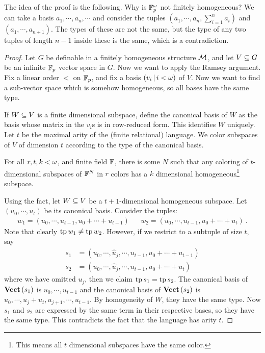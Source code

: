 \documentclass{amsart}
\begin{document}
The idea of the proof is the following.
Why is $\mathbb{F}_p^\omega$ not finitely homogeneous?
We can take a basis $a_1 , \cdots , a_n , \cdots$ and consider the tuples
$\left( a_1 , \cdots , a_n , \sum_{i = 1}^n a_i \right)$
and $\left( a_1 , \cdots , a_{n+1} \right)$. The types of these are not the same, 
but the type of any two tuples of length $n-1$ inside these
is the same, which is a contradiction.

\begin{proof}
Let $G$ be definable in a finitely homogeneous structure $\mathcal{M}$,
and let $V\subseteq G$ be an infinite $\mathbb{F}_p$ vector space in $G$.
Now we want to apply the Ramsey argument.
Fix a linear order $<$ on $\mathbb{F}_p$, and fix a basis
$\left( v_i \, \middle\vert \, i < \omega \right)$ of $V$.
Now we want to find a sub-vector space which is somehow homogeneous, so all bases have 
the same type.

If $W\subseteq V$ is a finite dimensional subspace, 
define the canonical basis of $W$ as the basis whose matrix in the $v_i$s is in
row-reduced form. This identifies $W$ uniquely.
Let $t$ be the maximal arity of the (finite relational) language.
We color subspaces of $V$ of dimension $t$ according to the type of the canonical basis. 

\begin{fact}
For all $r,t,k < \omega$, and finite field $\mathbb{F}$, there is some $N$ such that any coloring of
$t$-dimensional subspaces of $\mathbb{F}^N$ in $r$ colors has a $k$ dimensional
homogeneous\footnote{This means all $t$ dimensional subspaces have the same color.}
subspace.
\end{fact}

Using the fact, let $W\subseteq V$ be a $t+1$-dimensional homogeneous subspace. Let $\left(
u_0 , \cdots , u_t \right)$ be its canonical basis. Consider the tuples:
\begin{align}
w_1 = \left( u_0 , \cdots , u_{t-1} , u_0 + \cdots + u_{t-1} \right)
&&
w_2 = \left( u_0 , \cdots , u_{t-1} , u_0 + \cdots + u_t \right) \ .
\end{align}
Note that clearly $\operatorname{tp} w_1 \neq \operatorname{tp} w_2$. 
However, if we restrict to a subtuple of size $t$, say
\begin{align}
s_1 &= \left( u_0 , \cdots , \hat u_j , \cdots , u_{t-1} , u_0 + \cdots + u_{t-1}
\right)\\
s_2 &= \left( u_0 , \cdots , \hat u_j , \cdots , u_{t-1} , u_0 + \cdots + u_t \right)
\end{align}
where we have omitted $u_j$, then we claim $\operatorname{tp} s_1 = \operatorname{tp} s_2$.
The canonical basis of $\mathbf{Vect} \left( s_1 \right)$ is $u_0 , \cdots , u_{t-1}$
and the canonical basis of $\mathbf{Vect}\left( s_2 \right)$ is
$u_0 , \cdots , u_j + u_t , u_{j+1} , \cdots , u_{t-1}$.
By homogeneity of $W$, they have the same type.
Now $s_1$ and $s_2$ are expressed by the same term in their respective bases, so they have
the same type. This contradicts the fact that the language has arity $t$.
\end{proof}
\end{document}
